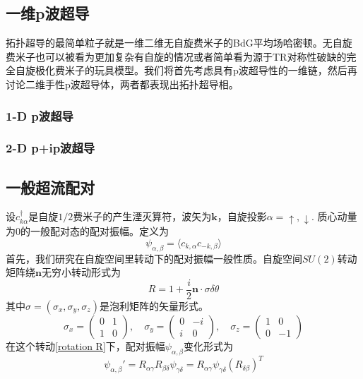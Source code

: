 \documentclass{article}
\numberwithin{equation}{subsection}
\newcommand{\mk}{\mathbf{k}}
\newcommand{\mn}{\mathbf{n}}
\begin{document}
\subsection{一维p波超导}
拓扑超导的最简单粒子就是一维二维无自旋费米子的BdG平均场哈密顿。无自旋费米子也可以被看为更加复杂有自旋的情况或者简单看为源于TR对称性破缺的完全自旋极化费米子的玩具模型。我们将首先考虑具有p波超导性的一维链，然后再讨论二维手性p波超导体，两者都表现出拓扑超导相。
\subsubsection{1-D p波超导}
\subsubsection{2-D p+ip波超导}
\subsection{一般超流配对}
设$c_{k\alpha}^\dagger$是自旋$1/2$费米子的产生湮灭算符，波矢为$\mk$，自旋投影$\alpha=\uparrow,\downarrow$. 质心动量为$0$的一般配对态的配对振幅。定义为
\begin{equation}
    \psi_{\alpha,\beta}=\langle c_{k,\alpha}c_{-k,\beta}\rangle
\end{equation}
首先，我们研究在自旋空间里转动下的配对振幅一般性质。自旋空间$SU(2)$转动矩阵绕$\mathbf{n}$无穷小转动形式为
\begin{equation}\label{rotation R}
    R=1+\frac{i}{2}\mn\cdot\sigma\delta \theta
\end{equation}
其中$\sigma=(\sigma_x,\sigma_y,\sigma_z)$是泡利矩阵的矢量形式。
\begin{equation}
    \sigma_x=\begin{pmatrix}
        0&1\\
        1&0
    \end{pmatrix},\quad\sigma_y=\begin{pmatrix}
        0&-i\\
        i&0
    \end{pmatrix},\quad\sigma_z=\begin{pmatrix}
        1&0\\
        0&-1
    \end{pmatrix}
\end{equation}
在这个转动\eqref{rotation R}下，配对振幅$\psi_{\alpha,\beta}$变化形式为
\begin{equation}
    \psi_{\alpha,\beta}'=R_{\alpha\gamma}R_{\beta\delta}\psi_{\gamma\delta}=R_{\alpha\gamma}\psi_{\gamma\delta}(R_{\delta\beta})^T
\end{equation}
\end{document}
